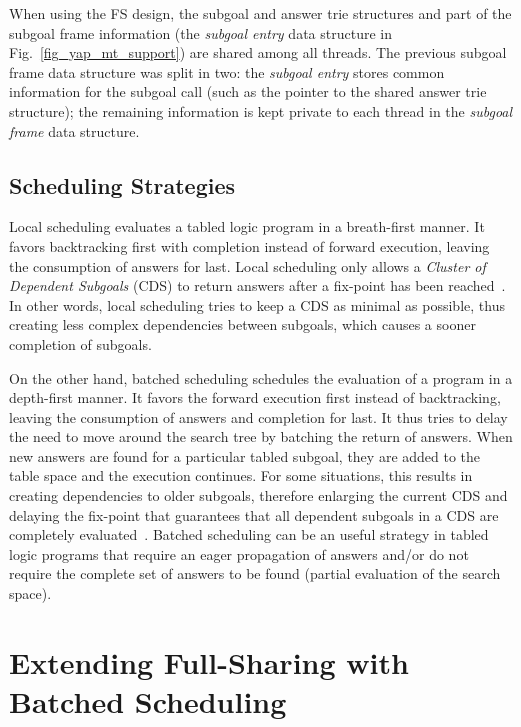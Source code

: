 \documentclass{llncs}
\begin{document}
When using the FS design, the subgoal and answer trie structures and
part of the subgoal frame information (the \emph{subgoal entry} data
structure in Fig.~\ref{fig_yap_mt_support}) are shared among all
threads. The previous subgoal frame data structure was split in two:
the \emph{subgoal entry} stores common information for the subgoal
call (such as the pointer to the shared answer trie structure); the
remaining information is kept private to each thread in the
\emph{subgoal frame} data structure.


\subsection{Scheduling Strategies}

Local scheduling evaluates a tabled logic program in a breath-first
manner. It favors backtracking first with completion instead of
forward execution, leaving the consumption of answers for last. Local
scheduling only allows a \emph{Cluster of Dependent Subgoals} (CDS) to
return answers after a fix-point has been reached~\cite{Freire-96}. In
other words, local scheduling tries to keep a CDS as minimal as
possible, thus creating less complex dependencies between subgoals,
which causes a sooner completion of subgoals.

On the other hand, batched scheduling schedules the evaluation of a
program in a depth-first manner. It favors the forward execution first
instead of backtracking, leaving the consumption of answers and
completion for last. It thus tries to delay the need to move around
the search tree by batching the return of answers. When new answers
are found for a particular tabled subgoal, they are added to the table
space and the execution continues. For some situations, this results
in creating dependencies to older subgoals, therefore enlarging the
current CDS and delaying the fix-point that guarantees that all
dependent subgoals in a CDS are completely
evaluated~\cite{Sagonas-98}. Batched scheduling can be an useful
strategy in tabled logic programs that require an eager propagation of
answers and/or do not require the complete set of answers to be found
(partial evaluation of the search space).



\section{Extending Full-Sharing with Batched Scheduling}
\end{document}
